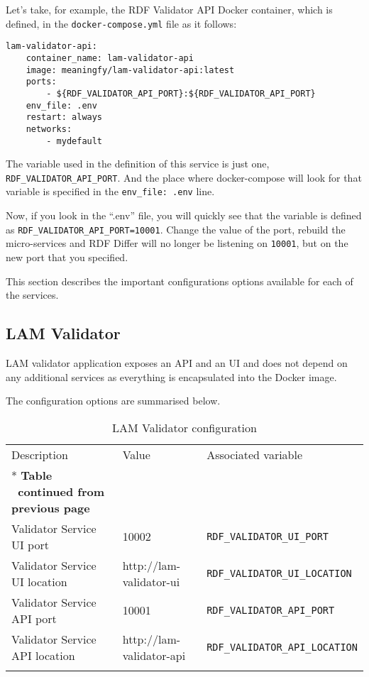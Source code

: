 Let’s take, for example, the RDF Validator API Docker container, which is defined, in the \texttt{docker-compose.yml} file as it follows:
\begin{lstlisting}[]
lam-validator-api:
	container_name: lam-validator-api
	image: meaningfy/lam-validator-api:latest
	ports:
		- ${RDF_VALIDATOR_API_PORT}:${RDF_VALIDATOR_API_PORT}
	env_file: .env
	restart: always
	networks:
		- mydefault
\end{lstlisting}
The variable used in the definition of this service is just one, \texttt{RDF\_VALIDATOR\_API\_PORT}. And the place where docker-compose will look for that variable is specified in the \texttt{env\_file: .env} line.

Now, if you look in the “.env” file, you will quickly see that the variable is defined as \texttt{RDF\_VALIDATOR\_API\_PORT=10001}. Change the value of the port, rebuild the micro-services and RDF Differ will no longer be listening on \texttt{10001}, but on the new port that you specified.


This section describes the important configurations options available for each of the services.


\subsection{LAM Validator}

LAM validator application exposes an API and an UI and does not depend on any additional services as everything is encapsulated into the Docker image. 

The configuration options are summarised below.

\begin{longtable}[c]{@{}p{4cm}p{5cm}l@{}}
	\toprule
	Description           & Value                   & Associated variable                   \\* \midrule
	\endfirsthead
	\multicolumn{3}{c}%
	{{\bfseries Table \thetable\ continued from previous page}}                             \\
	\endhead
	\bottomrule
	\endfoot
	\endlastfoot
	Validator Service UI port           & 10002                             & \texttt{RDF\_VALIDATOR\_UI\_PORT}      \\
	Validator Service UI location       & http://lam-validator-ui           & \texttt{RDF\_VALIDATOR\_UI\_LOCATION}  \\
	Validator Service API port          & 10001                             & \texttt{RDF\_VALIDATOR\_API\_PORT}     \\
	Validator Service API location      & http://lam-validator-api          & \texttt{RDF\_VALIDATOR\_API\_LOCATION} \\
	\bottomrule
	\caption{LAM Validator configuration}
	\label{tab:validator}                                                                   \\
\end{longtable}


